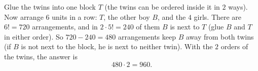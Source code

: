 Glue the twins into one block $T$ (the twins can be ordered inside it in $2$ ways). Now arrange $6$ units in a row: $T$, the other boy $B$, and the $4$ girls. There are $6!=720$ arrangements, and in $2\cdot5!=240$ of them $B$ is next to $T$ (glue $B$ and $T$ in either order). So $720-240=480$ arrangements keep $B$ away from both twins (if $B$ is not next to the block, he is next to neither twin). With the $2$ orders of the twins, the answer is
\[
480\cdot2=\boxed{960}.
\]
